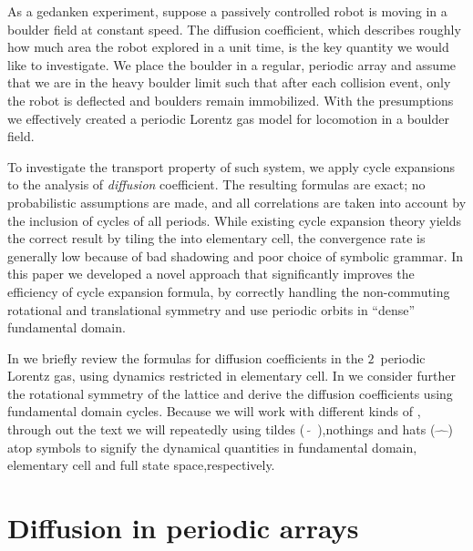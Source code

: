 \documentclass[aps,pre,
                showpacs,
                twocolumn,
                groupedaddress,
                floatfix]{revtex4-1}
\begin{document}
As a gedanken experiment, suppose a passively controlled robot is moving in a boulder field at constant speed. The diffusion coefficient, which describes roughly how much area the robot explored in a unit time, is the key quantity we would like to investigate. We place the boulder in a regular, periodic array and assume that we are in the heavy boulder limit such that after each collision event, only the robot is deflected and boulders remain immobilized. With the presumptions we effectively created a periodic Lorentz gas model for locomotion in a boulder field.

To investigate the transport property of such system, we apply cycle expansions to the analysis of {\em diffusion} coefficient. The resulting formulas are exact; no probabilistic assumptions are made, and all correlations are taken into account by the  inclusion of cycles of all periods. While existing cycle expansion theory yields the correct result by tiling the {\statesp} into elementary cell, the convergence rate is generally low because of bad shadowing and poor choice of symbolic grammar. In this paper we developed a novel approach that significantly improves the efficiency of cycle expansion formula, by correctly handling the non-commuting rotational and translational symmetry and use periodic orbits in ``dense'' fundamental domain. 


In  we briefly review the formulas for diffusion coefficients in the $2$\dmn\ periodic Lorentz gas, using dynamics restricted in elementary cell. In we consider further the rotational symmetry of the lattice and derive the diffusion coefficients using fundamental domain cycles. Because we will work with different kinds of \statesp, through out the text we will repeatedly using tildes ($\tilde{\quad}$),nothings and hats ($\hat{\quad}$) atop symbols to signify the dynamical quantities in fundamental domain, elementary cell and full state space,respectively.

\section{Diffusion in periodic arrays}
\label{s-DiffPerArr}
\end{document}

